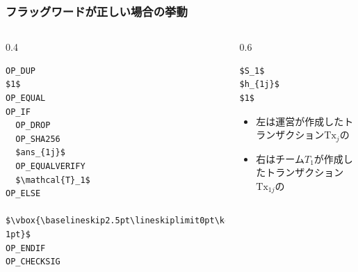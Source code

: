 \begin{frame}[fragile]
  \frametitle{フラッグワードが正しい場合の挙動}

  \pause
  \begin{columns}
    \begin{column}{0.4\textwidth}
      \begin{minipage}[c][0.9\textheight][c]{\linewidth}
\begin{lstlisting}[style=bitcoin-script, caption={$\text{Tx}_j$の\ScriptPubKey}]
OP_DUP
$1$
OP_EQUAL
OP_IF
  OP_DROP
  OP_SHA256
  $ans_{1j}$
  OP_EQUALVERIFY
  $\mathcal{T}_1$
OP_ELSE
  $\vbox{\baselineskip2.5pt\lineskiplimit0pt\kern1pt\hbox{.}\hbox{.}\hbox{.}\kern-1pt}$
OP_ENDIF
OP_CHECKSIG 
\end{lstlisting}
      \end{minipage}
    \end{column}
    \begin{column}{0.6\textwidth}
      \begin{center}
         \begin{minipage}[c]{0.6666666\linewidth}
\begin{lstlisting}[style=bitcoin-script, caption={$\text{Tx}_{1j}$の\ScriptSig}]
$S_1$
$h_{1j}$
$1$
\end{lstlisting}
         \end{minipage}
       \end{center}

       \pause
       \begin{itemize}
         \item<+-> 左は運営が作成したトランザクション$\text{Tx}_j$の\ScriptPubKey
         \item<+-> 右はチーム$T_1$が作成したトランザクション$\text{Tx}_{1j}$の\ScriptSig
       \end{itemize}
    \end{column}
  \end{columns}
\end{frame}

